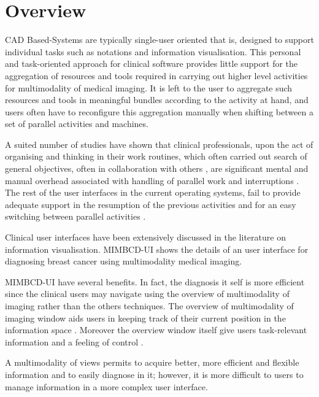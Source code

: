 
\chapter{Overview}
\label{chapter:overview}

CAD Based-Systems are typically single-user oriented that is, designed to support individual tasks such as notations and information visualisation. This personal and task-oriented approach for clinical software provides little support for the aggregation of resources and tools required in carrying out higher level activities for multimodality of medical imaging. It is left to the user to aggregate such resources and tools in meaningful bundles according to the activity at hand, and users often have to reconfigure this aggregation manually when shifting between a set of parallel activities and machines.

A  suited  number  of  studies  have  shown  that  clinical  professionals, upon the act of organising and thinking in their work routines, which often carried out search of general objectives, often in collaboration with others \cite{Bardram04realtimecollaboration, citeulike:1090639, Mark05notask}, are significant mental and manual overhead associated with handling of  parallel  work  and  interruptions \cite{Czerwinski04adiary, Smith03groupbar:the}. The rest of the user  interfaces  in  the  current operating systems, fail to provide adequate support in the resumption of the previous  activities  and  for an  easy  switching  between  parallel  activities \cite{Robertson04scalablefabric:, Robertson00thetask}.

Clinical user interfaces have been extensively discussed in the literature on information visualisation. MIMBCD-UI shows the details of an user interface for diagnosing breast cancer using multimodality medical imaging.

MIMBCD-UI have several benefits. In fact, the diagnosis it self is more efficient since the clinical users may navigate using the overview of multimodality of imaging rather than the others techniques. The overview of multimodality of imaging window aids users in keeping track of their current position in the information space \cite{plaisant1994image}. Moreover the overview window itself give users task-relevant information and a feeling of control \cite{shneiderman1987designing}.

A multimodality of views permits to acquire better, more efficient and flexible information and to easily diagnose in it; however, it is more difficult to users to manage information in a more complex user interface.

